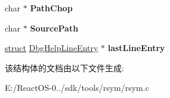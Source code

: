 \begin{DoxyCompactItemize}
\mbox{\label{struct_dbg_help_string_tab_a488c911cd1b2a6606f681d36b6315957}} 
char $\ast$ {\bfseries Path\+Chop}
\item 
\mbox{\label{struct_dbg_help_string_tab_a3e790b3df2c41c42028346c7aed18125}} 
char $\ast$ {\bfseries Source\+Path}
\item 
\mbox{\label{struct_dbg_help_string_tab_ad073a7949508a1f3f62e77d1a140301f}} 
\hyperlink{interfacestruct}{struct} \hyperlink{struct_dbg_help_line_entry}{Dbg\+Help\+Line\+Entry} $\ast$ {\bfseries last\+Line\+Entry}
\end{DoxyCompactItemize}


该结构体的文档由以下文件生成\+:\begin{DoxyCompactItemize}
\item 
E\+:/\+React\+O\+S-\/0../sdk/tools/rsym/rsym.\+c\end{DoxyCompactItemize}
